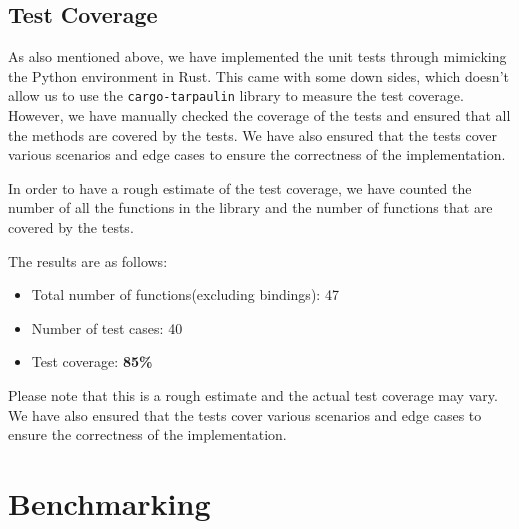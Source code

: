 \documentclass[review]{AIM_report}
\begin{document}
\subsection{Test Coverage}
As also mentioned above, we have implemented the unit tests through mimicking the Python environment in Rust.
This came with some down sides, which doesn't allow us to use the \texttt{cargo-tarpaulin} library to measure the test coverage.
However, we have manually checked the coverage of the tests and ensured that all the methods are covered by the tests. We have also ensured that the tests cover various scenarios and edge cases to ensure the correctness of the implementation.

In order to have a rough estimate of the test coverage, we have counted the number of all the functions in the library and the number of functions that are covered by the tests.

The results are as follows:
\begin{itemize}
    \item Total number of functions(excluding bindings): 47
    \item Number of test cases: 40
    \item Test coverage: \textbf{85\%}
\end{itemize}

Please note that this is a rough estimate and the actual test coverage may vary. We have also ensured that the tests cover various scenarios and edge cases to ensure the correctness of the implementation.

\newpage
\section{Benchmarking}
\newpage
\pagestyle{empty}



\newpage
\pagestyle{empty}



\newpage
\pagestyle{empty}


\end{document}
